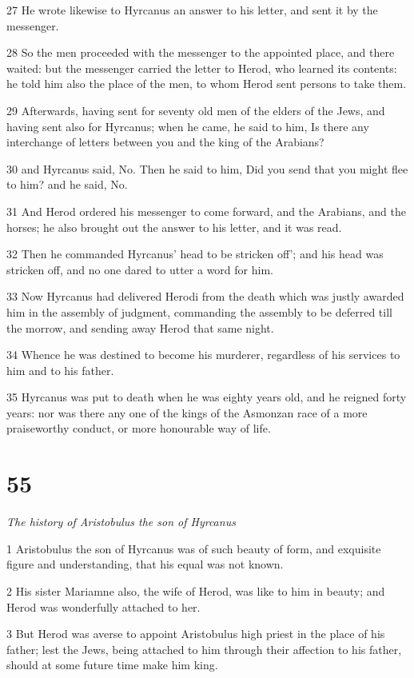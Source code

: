 27 He wrote likewise to Hyrcanus an answer to his letter, and sent it by the messenger. 

28 So the men proceeded with the messenger to the appointed place, and there waited: but the messenger carried the letter to Herod, who learned its contents: he told him also the place of the men, to whom Herod sent persons to take them. 

29 Afterwards, having sent for seventy old men of the elders of the Jews, and having sent also for Hyrcanus; when he came, he said to him, Is there any interchange of letters between you and the king of the Arabians? 

30 and Hyrcanus said, No. Then he said to him, Did you send that you might flee to him? and he said, No. 

31 And Herod ordered his messenger to come forward, and the Arabians, and the horses; he also brought out the answer to his letter, and it was read. 

32 Then he commanded Hyrcanus’ head to be stricken off'; and his head was stricken off, and no one dared to utter a word for him. 

33 Now Hyrcanus had delivered Herodi from the death which was justly awarded him in the assembly of judgment, commanding the assembly to be deferred till the morrow, and sending away Herod that same night. 

34 Whence he was destined to become his murderer, regardless of his services to him and to his father. 

35 Hyrcanus was put to death when he was eighty years old, and he reigned forty years: nor was there any one of the kings of the Asmonzan race of a more praiseworthy conduct, or more honourable way of life. 

\chapter{55}

\par \textit{The history of Aristobulus the son of Hyrcanus}

1 Aristobulus the son of Hyrcanus was of such beauty of form, and exquisite figure and understanding, that his equal was not known. 

2 His sister Mariamne also, the wife of Herod, was like to him in beauty; and Herod was wonderfully attached to her. 

3 But Herod was averse to appoint Aristobulus high priest in the place of his father; lest the Jews, being attached to him through their affection to his father, should at some future time make him king. 

